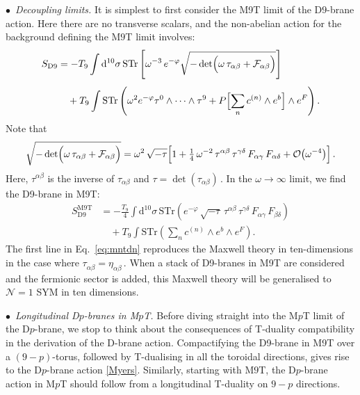 \documentclass[11pt]{article}
\newcommand{\be}{\begin{equation}}
\newcommand{\ee}{\end{equation}}
\newcommand{\CN}{\mathcal{N}}
\newcommand{\wa}{\alpha}
\newcommand{\wb}{\beta}
\newcommand{\wc}{\gamma}
\newcommand{\wvd}{\delta}
\newcommand{\dd}{\mathrm{d}}
\begin{document}
\noindent $\bullet$~{\it Decoupling limits.} It is simplest to first consider the M9T limit of the D$9$-brane action. 
Here there are no transverse scalars, and the non-abelian action for the background defining the M$9$T limit involves:
\be
\begin{split} 
    S_{\text{D9}} & = - T_9 \int \dd^{10} \sigma \,  \text{STr} \left[
\omega^{-3} \, e^{-\varphi} \sqrt{-\det \Bigl( \omega \, \tau_{\wa\wb} + \mathcal{F}_{\wa\wb} \Bigr)} \right] \\[4pt]
    & \quad + T_9 \int \text{STr} \left(
\omega^2 e^{-\varphi} \tau^0 \wedge \dots \wedge \tau^9 + 
P \Bigl[ \sum_n c^{(n)} \wedge e^b \Bigr] \wedge e^{F} \right).
\end{split} 
\ee
%
Note that
%
\be
    \sqrt{-\det \Bigl( \omega \, \tau_{\wa\wb} + \mathcal{F}_{\wa\wb} \Bigr)} = \omega^2 \, \sqrt{-\tau} \Bigl[ 1 + \tfrac{1}{4} \, \omega^{-2} \, \tau^{\wa\wb} \, \tau^{\wc\wvd} \, F_{\wa\wc} \, F_{\wa\wvd}  + \mathcal{O} \bigl( \omega^{-4} \bigr) \Bigr]\,.
\ee
Here, $\tau^{\alpha\beta}$ is the inverse of $\tau_{\alpha\beta}$ and $\tau = \det (\tau_{\alpha\beta})$\,. 
In the $\omega \rightarrow \infty$ limit, we find the D9-brane in M9T:
%
\be \label{eq:mntdn}
\begin{split} 
    S^\text{M9T}_{\text{D9}} 
    & = - \frac{T_9}{4} \int \dd^{10} \sigma \, \text{STr} \left( e^{-\varphi} \, \sqrt{-\tau} \, \tau^{\alpha\beta} \, \tau^{\gamma\delta} \, F^{}_{\alpha\gamma} \, F^{}_{\beta\delta} \right) \\[4pt]
    & \quad + T_9 \int \text{STr} \left( \sum_n c^{(n)} \wedge e^b \wedge e^{F} \right).
\end{split} 
\ee
%
The first line in Eq.~\eqref{eq:mntdn} reproduces the Maxwell theory in ten-dimensions in the case where $\tau^{}_{\alpha\beta} = \eta^{}_{\alpha\beta}$\,. When a stack of D9-branes in M9T are considered and the fermionic sector is added, this Maxwell theory will be generalised to $\CN = 1$ SYM in ten dimensions.

\vspace{3mm}

\noindent $\bullet$~{\it Longitudinal D$p$-branes in M$p$T.} 
Before diving straight into the M$p$T limit of the D$p$-brane, we stop to think about the consequences of T-duality compatibility in the derivation of the D-brane action. 
Compactifying the D9-brane in M9T over a $(9-p)$-torus, followed by T-dualising in all the toroidal directions, gives rise to the D$p$-brane action \eqref{Myers}. Similarly, starting with M$9$T, the D$p$-brane action in M$p$T should follow from a longitudinal T-duality on $9-p$ directions.
\end{document}
